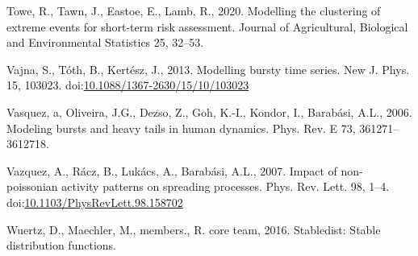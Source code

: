 \documentclass[]{elsarticle} %
\begin{document}
\leavevmode\hypertarget{ref-towe2020modelling}{}%
Towe, R., Tawn, J., Eastoe, E., Lamb, R., 2020. Modelling the clustering
of extreme events for short-term risk assessment. Journal of
Agricultural, Biological and Environmental Statistics 25, 32--53.

\leavevmode\hypertarget{ref-Vajna2013}{}%
Vajna, S., Tóth, B., Kertész, J., 2013. Modelling bursty time series.
New J. Phys. 15, 103023.
doi:\href{https://doi.org/10.1088/1367-2630/15/10/103023}{10.1088/1367-2630/15/10/103023}

\leavevmode\hypertarget{ref-Vasquez2006}{}%
Vasquez, a, Oliveira, J.G., Dezso, Z., Goh, K.-I., Kondor, I., Barabási,
A.L., 2006. Modeling bursts and heavy tails in human dynamics. Phys.
Rev. E 73, 361271--3612718.

\leavevmode\hypertarget{ref-Vazquez2007}{}%
Vazquez, A., Rácz, B., Lukács, A., Barabási, A.L., 2007. Impact of
non-poissonian activity patterns on spreading processes. Phys. Rev.
Lett. 98, 1--4.
doi:\href{https://doi.org/10.1103/PhysRevLett.98.158702}{10.1103/PhysRevLett.98.158702}

\leavevmode\hypertarget{ref-stabledist}{}%
Wuertz, D., Maechler, M., members., R. core team, 2016. Stabledist:
Stable distribution functions.
\end{document}
